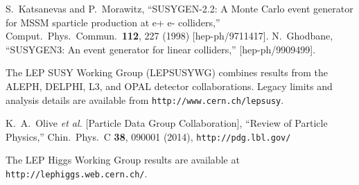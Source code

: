 \documentclass[12pt]{article}
\begin{document}
\begin{thebibliography}{999}



S.~Katsanevas and P.~Morawitz,
  ``SUSYGEN-2.2: A Monte Carlo event generator for MSSM sparticle production
  at e+ e- colliders,''
  Comput.\ Phys.\ Commun.\  {\bf 112}, 227 (1998)
  [hep-ph/9711417].
N.~Ghodbane,
  ``SUSYGEN3: An event generator for linear colliders,''
  [hep-ph/9909499].

 The LEP SUSY Working Group (LEPSUSYWG) combines
results from the ALEPH, DELPHI, L3, and OPAL detector collaborations.
Legacy limits and analysis details
are available from {\tt http://www.cern.ch/lepsusy}.

K.~A.~Olive {\it et al.} [Particle Data Group Collaboration],
  ``Review of Particle Physics,''
  Chin.\ Phys.\ C {\bf 38}, 090001 (2014),
\verb$http://pdg.lbl.gov/$

 The LEP Higgs Working Group results are available
at {\tt http://lephiggs.web.cern.ch/}.


\end{thebibliography}
\end{document}

